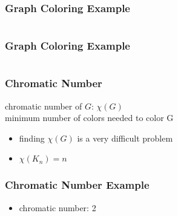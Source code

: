 \documentclass[dvipsnames]{beamer}
\begin{document}
\begin{frame}
  \frametitle{Graph Coloring Example}

  \begin{example}
    \begin{columns}
      \begin{center}
      \end{center}

      \begin{center}
      \end{center}
    \end{columns}
  \end{example}
\end{frame}

\begin{frame}
  \frametitle{Graph Coloring Example}

  \begin{example}
    \begin{columns}
      \begin{center}
      \end{center}

      \begin{center}
      \end{center}
    \end{columns}
  \end{example}
\end{frame}

\begin{frame}
  \frametitle{Chromatic Number}

  \begin{definition}
    \alert{chromatic number} of $G$: $\chi (G)$\\
    minimum number of colors needed to color G
  \end{definition}

  \begin{itemize}
     \item finding $\chi (G)$ is a very difficult problem
     \item $\chi (K_n) = n$
  \end{itemize}
\end{frame}

\begin{frame}
  \frametitle{Chromatic Number Example}

  \begin{example}
    \begin{center}
    \end{center}

    \begin{itemize}
      \item chromatic number: 2
    \end{itemize}
  \end{example}
\end{frame}
\end{document}
